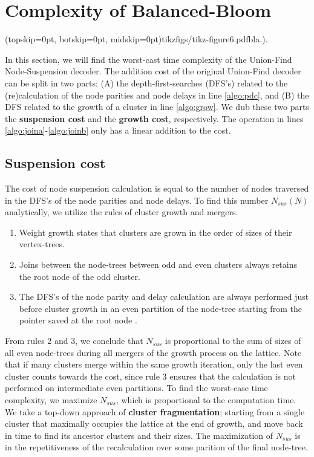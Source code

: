 
\section{Complexity of Balanced-Bloom}\label{sec:complexity}

\Figure[htb](topskip=0pt, botskip=0pt, midskip=0pt){tikzfigs/tikz-figure6.pdf}{bla.).\label{fig6}}

In this section, we will find the worst-cast time complexity of the Union-Find Node-Suspension decoder. The addition cost of the original Union-Find decoder can be split in two parts: (A) the depth-first-searches (DFS's) related to the (re)calculation of the node parities and node delays in line \ref{algo:pdc}, and (B) the DFS related to the growth of a cluster in line \ref{algo:grow}. We dub these two parts the \textbf{suspension cost} and the \textbf{growth cost}, respectively. The  operation in lines \ref{algo:joina}-\ref{algo:joinb} only has a linear addition to the cost.

\subsection{Suspension cost}\label{sec:suscomplexity}

The cost of node suspension calculation is equal to the number of nodes traversed in the DFS's of the node parities and node delays. To find this number $N_{sus}(N)$ analytically, we utilize the rules of cluster growth and mergers. 
\begin{enumerate}
  \item Weight growth states that clusters are grown in the order of sizes of their vertex-trees. 
  \item Joins between the node-trees between odd and even clusters always retains the root node of the odd cluster.
  \item The DFS's of the node parity and delay calculation are always performed just before cluster growth in an even partition of the node-tree starting from the pointer saved at the root node .
\end{enumerate}
From rules 2 and 3, we conclude that $N_{sus}$ is proportional to the sum of sizes of all even node-trees during all mergers of the growth process on the lattice. Note that if many clusters merge within the same growth iteration, only the last even cluster counts towards the cost, since rule 3 ensures that the calculation is not performed on intermediate even partitions. To find the worst-case time complexity, we maximize $N_{sus}$, which is proportional to the computation time. We take a top-down approach of \textbf{cluster fragmentation}; starting from a single cluster that maximally occupies the lattice at the end of growth, and move back in time to find its ancestor clusters and their sizes. The maximization of $N_{sus}$ is in the repetitiveness of the recalculation over some parition of the final node-tree. 


